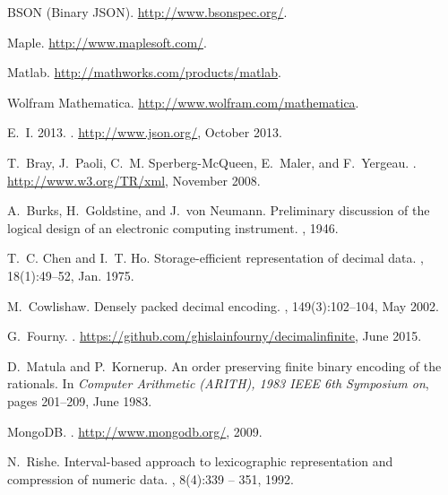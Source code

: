 \documentclass[final,leqno,onefignum,onetabnum]{siamltex1213}
\begin{document}

\begin{thebibliography}{10}

{{BSON (Binary JSON)}}.
\newblock \url{http://www.bsonspec.org/}.

Maple.
\newblock \url{http://www.maplesoft.com/}.

Matlab.
\newblock \url{http://mathworks.com/products/matlab}.

{{Wolfram Mathematica}}.
\newblock \url{http://www.wolfram.com/mathematica}.

E.~I. 2013.
.
\newblock \url{http://www.json.org/}, October 2013.

T.~Bray, J.~Paoli, C.~M. Sperberg-McQueen, E.~Maler, and F.~Yergeau.
.
\newblock \url{http://www.w3.org/TR/xml}, November 2008.

A.~Burks, H.~Goldstine, and J.~von Neumann.
\newblock Preliminary discussion of the logical design of an electronic
  computing instrument.
, 1946.

T.~C. Chen and I.~T. Ho.
\newblock Storage-efficient representation of decimal data.
, 18(1):49--52, Jan. 1975.

M.~Cowlishaw.
\newblock Densely packed decimal encoding.
,
  149(3):102--104, May 2002.

G.~Fourny.
.
\newblock \url{https://github.com/ghislainfourny/decimalinfinite}, June 2015.

D.~Matula and P.~Kornerup.
\newblock An order preserving finite binary encoding of the rationals.
\newblock In {\em Computer Arithmetic (ARITH), 1983 IEEE 6th Symposium on},
  pages 201--209, June 1983.

MongoDB.
.
\newblock \url{http://www.mongodb.org/}, 2009.

N.~Rishe.
\newblock Interval-based approach to lexicographic representation and
  compression of numeric data.
, 8(4):339 -- 351, 1992.

\end{thebibliography}
\end{document}
